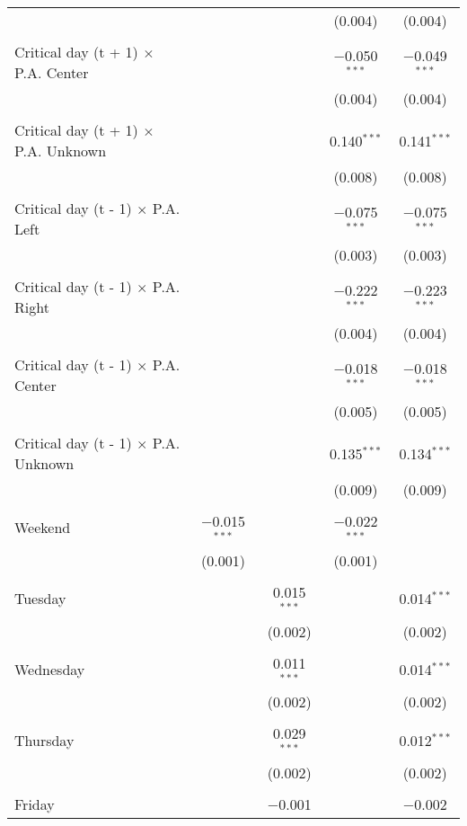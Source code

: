 \documentclass[
]{article}
\begin{document}
\begin{table}[!htbp]
{\begin{tabular}{@{\extracolsep{5pt}}lcccc}
  &  &  & (0.004) & (0.004) \\ 
  & & & & \\ 
 Critical day (t + 1) $\times$ P.A. Center &  &  & $-$0.050$^{***}$ & $-$0.049$^{***}$ \\ 
  &  &  & (0.004) & (0.004) \\ 
  & & & & \\ 
 Critical day (t + 1) $\times$ P.A. Unknown &  &  & 0.140$^{***}$ & 0.141$^{***}$ \\ 
  &  &  & (0.008) & (0.008) \\ 
  & & & & \\ 
 Critical day (t - 1) $\times$ P.A. Left &  &  & $-$0.075$^{***}$ & $-$0.075$^{***}$ \\ 
  &  &  & (0.003) & (0.003) \\ 
  & & & & \\ 
 Critical day (t - 1) $\times$ P.A. Right &  &  & $-$0.222$^{***}$ & $-$0.223$^{***}$ \\ 
  &  &  & (0.004) & (0.004) \\ 
  & & & & \\ 
 Critical day (t - 1) $\times$ P.A. Center &  &  & $-$0.018$^{***}$ & $-$0.018$^{***}$ \\ 
  &  &  & (0.005) & (0.005) \\ 
  & & & & \\ 
 Critical day (t - 1) $\times$ P.A. Unknown &  &  & 0.135$^{***}$ & 0.134$^{***}$ \\ 
  &  &  & (0.009) & (0.009) \\ 
  & & & & \\ 
 Weekend & $-$0.015$^{***}$ &  & $-$0.022$^{***}$ &  \\ 
  & (0.001) &  & (0.001) &  \\ 
  & & & & \\ 
 Tuesday &  & 0.015$^{***}$ &  & 0.014$^{***}$ \\ 
  &  & (0.002) &  & (0.002) \\ 
  & & & & \\ 
 Wednesday &  & 0.011$^{***}$ &  & 0.014$^{***}$ \\ 
  &  & (0.002) &  & (0.002) \\ 
  & & & & \\ 
 Thursday &  & 0.029$^{***}$ &  & 0.012$^{***}$ \\ 
  &  & (0.002) &  & (0.002) \\ 
  & & & & \\ 
 Friday &  & $-$0.001 &  & $-$0.002 \\ 

\end{tabular}}
\end{table}
\end{document}
